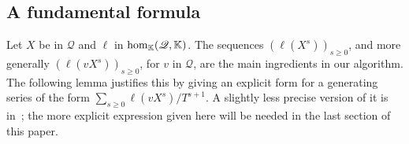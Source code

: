 \documentclass[12pt]{article}
\newcommand{\lf}{X}
\newcommand{\residueI}{\mathscr{Q}}
\def\K{\mathbb{K}}
\def\K {\ensuremath{\mathbb{K}}}
\begin{document}

\subsection{A fundamental formula}  \label{ssec:genseries}

Let $\lf$ be in $\residueI$ and $\ell$ in ${\rm hom}_\K(\residueI,\K)$.  The sequences
$(\ell(\lf^s))_{s\ge 0}$, and more generally $(\ell(v \lf^s))_{s\ge
  0}$, for $v$ in $\residueI$, are the main ingredients in our algorithm.  The
following lemma justifies this by giving an explicit form for a
generating series of the form $\sum_{s \ge 0} \ell(v
\lf^s)/T^{s+1}$. A slightly less precise version of it is in~\cite{BoSaSc03};
the more explicit expression given here will be needed in the last
section of this paper.
\end{document}
